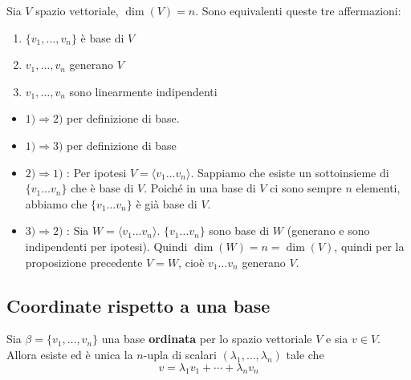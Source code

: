 \documentclass[
  a4paper,
]{article}
\providecommand{\tightlist}{%
  \setlength{\itemsep}{0pt}\setlength{\parskip}{0pt}}
\providecommand{\tightlist}{}
\begin{document}
\begin{teoremabox}
Sia \(V\) spazio vettoriale, \(\dim(V) = n\). Sono equivalenti queste
tre affermazioni:

\begin{enumerate}
\def\labelenumi{\arabic{enumi}.}
\tightlist
\item
  \(\{v_1, \dots , v_n\}\) è base di \(V\)
\item
  \(v_1, \dots, v_n\) generano \(V\)
\item
  \(v_1, \dots, v_n\) sono linearmente indipendenti
\end{enumerate}
\end{teoremabox}

\begin{proofbox}
\begin{itemize}
\tightlist
\item
  \(1) \Rightarrow 2)\) per definizione di base.
\item
  \(1) \Rightarrow 3)\) per definizione di base
\item
  \(2) \Rightarrow 1)\) : Per ipotesi
  \(V = \langle v_1 \dots v_n\rangle\). Sappiamo che esiste un
  sottoinsieme di \(\{v_1 \dots v_n\}\) che è base di \(V\). Poiché in
  una base di \(V\) ci sono sempre \(n\) elementi, abbiamo che
  \(\{v_1 \dots v_n\}\) è già base di \(V\).
\item
  \(3) \Rightarrow 2)\) : Sia \(W = \langle v_1 \dots v_n\rangle\).
  \(\{v_1 \dots v_n\}\) sono base di \(W\) (generano e sono indipendenti
  per ipotesi). Quindi \(\dim(W) = n = \dim(V)\), quindi per la
  proposizione precedente \(V = W\), cioè \(v_1 \dots v_n\) generano
  \(V\).
\end{itemize}
\end{proofbox}

\hypertarget{coordinate-rispetto-a-una-base}{%
\subsection{Coordinate rispetto a una
base}\label{coordinate-rispetto-a-una-base}}

\begin{propositionbox}
Sia \(\beta=\{v_1,\ldots,v_n\}\) una base \textbf{ordinata} per lo
spazio vettoriale \(V\) e sia \(v\in V\). Allora esiste ed è unica la
\(n\)-upla di scalari \((\lambda_1,\ldots,\lambda_n)\) tale che\\
\[  
v=\lambda_1 v_1+\cdots+\lambda_n v_n
\]
\end{propositionbox}
\end{document}
